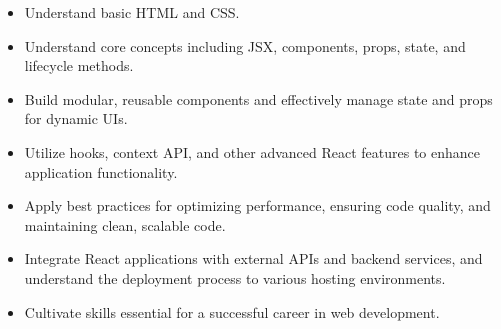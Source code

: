 \begin{itemize}
    \item Understand basic HTML and CSS.
    \item Understand core concepts including JSX, components, props, state, and lifecycle methods.
    \item Build modular, reusable components and effectively manage state and props for dynamic UIs.
    \item Utilize hooks, context API, and other advanced React features to enhance application functionality.
    \item Apply best practices for optimizing performance, ensuring code quality, and maintaining clean, scalable code.
    \item Integrate React applications with external APIs and backend services, and understand the deployment process to various hosting environments.
    \item Cultivate skills essential for a successful career in web development.
\end{itemize}
